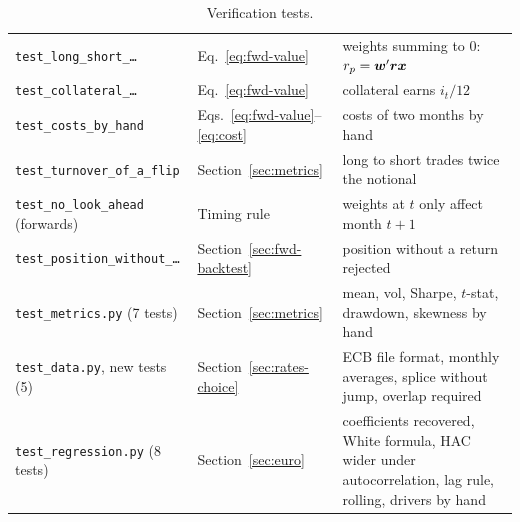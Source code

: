\begin{table}[h]
\begin{tabular}{@{}llp{5.6cm}@{}}
\texttt{test\_long\_short\_\ldots} & Eq.~\eqref{eq:fwd-value} & weights summing to 0: $r_p = \boldsymbol{w}'\boldsymbol{rx}$ \\
\texttt{test\_collateral\_\ldots} & Eq.~\eqref{eq:fwd-value} & collateral earns $i_t/12$ \\
\texttt{test\_costs\_by\_hand} & Eqs.~\eqref{eq:fwd-value}--\eqref{eq:cost} & costs of two months by hand \\
\texttt{test\_turnover\_of\_a\_flip} & Section~\ref{sec:metrics} & long to short trades twice the notional \\
\texttt{test\_no\_look\_ahead} (forwards) & Timing rule & weights at $t$ only affect month $t+1$ \\
\texttt{test\_position\_without\_\ldots} & Section~\ref{sec:fwd-backtest} & position without a return rejected \\
\texttt{test\_metrics.py} (7 tests) & Section~\ref{sec:metrics} & mean, vol, Sharpe, $t$-stat, drawdown, skewness by hand \\
\midrule
\texttt{test\_data.py}, new tests (5) & Section~\ref{sec:rates-choice} & ECB file format, monthly averages, splice without jump, overlap required \\
\texttt{test\_regression.py} (8 tests) & Section~\ref{sec:euro} & coefficients recovered, White formula, HAC wider under autocorrelation, lag rule, rolling, drivers by hand \\
\bottomrule
\end{tabular}
\caption{Verification tests.}
\end{table}
